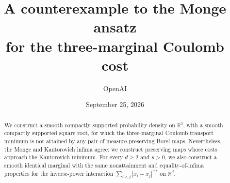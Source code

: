 \documentclass[11pt]{article}
\title{A counterexample to the Monge ansatz\\
for the three-marginal Coulomb cost}
\author{OpenAI}
\date{September 25, 2026}
\theoremstyle{remark}
\newcommand{\R}{\mathbb R}
\begin{document}
\maketitle
\begin{abstract}
We construct a smooth compactly supported probability density on
\(\R^3\), with a smooth compactly supported square root, for which the
three-marginal Coulomb transport minimum is not attained by any pair of
measure-preserving Borel maps. Nevertheless, the Monge and Kantorovich
infima agree: we construct preserving maps whose costs approach the
Kantorovich minimum. For every \(d\ge2\) and \(s>0\), we also construct a
smooth identical marginal with the same nonattainment and equality-of-infima
properties for the inverse-power interaction
\(\sum_{i<j}|x_i-x_j|^{-s}\) on \(\R^d\).
\end{abstract}











\end{document}
